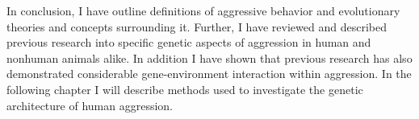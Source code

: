 \documentclass[../header.tex]{subfiles}
\begin{document}
In conclusion, I have outline definitions of aggressive behavior and evolutionary theories and concepts surrounding it.
Further, I have reviewed and described previous research into specific genetic aspects of aggression in human and nonhuman animals alike.
In addition I have shown that previous research has also demonstrated considerable gene-environment interaction within aggression.
In the following chapter I will describe methods used to investigate the genetic architecture of human aggression.
\end{document}
